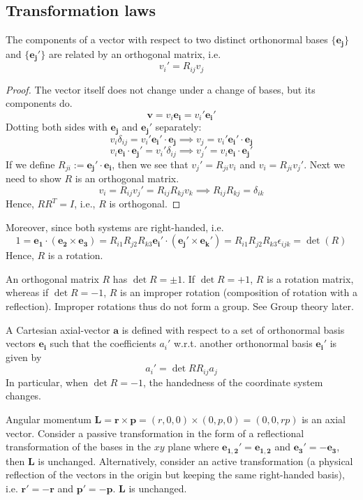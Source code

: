 \documentclass[a4paper]{article}
\begin{document}
\subsection{Transformation laws}
\begin{prop}[Vectors]
The components of a vector with respect to two distinct orthonormal bases $\{\mathbf{e_j}\}$ and $\{\mathbf{e_j'}\}$ are related by an orthogonal matrix, i.e.
$$v_i'=R_{ij}v_j$$
\end{prop}
\begin{proof}
The vector itself does not change under a change of bases, but its components do.
$$\mathbf{v}=v_i\mathbf{e_i}=v_i'\mathbf{e_i'}$$
Dotting both sides with $\mathbf{e_j}$ and $\mathbf{e_j'}$ separately:
$$v_i\delta_{ij}=v_i'\mathbf{e_i'}\cdot\mathbf{e_j}\implies v_j=v_i'\mathbf{e_i'}\cdot\mathbf{e_j}$$
$$v_i\mathbf{e_i}\cdot\mathbf{e_j'}=v_i'\delta_{ij}\implies v_j'=v_i\mathbf{e_i}\cdot\mathbf{e_j'}$$
If we define $R_{ji}:=\mathbf{e_j'}\cdot\mathbf{e_i}$, then we see that $v_j'=R_{ji}v_i$ and $v_i=R_{ji}v_j'$. Next we need to show $R$ is an orthogonal matrix.
$$v_i=R_{ij}v_j'=R_{ij}R_{kj}v_k\implies R_{ij}R_{kj}=\delta_{ik}$$
Hence, $RR^T=I$, i.e., $R$ is orthogonal.
\end{proof}
Moreover, since both systems are right-handed, i.e. $$1=\mathbf{e_1}\cdot(\mathbf{e_2}\times\mathbf{e_3})=R_{i1}R_{j2}R_{k3}\mathbf{e_i'}\cdot(\mathbf{e_j'}\times\mathbf{e_k'})=R_{i1}R_{j2}R_{k3}\epsilon_{ijk}=\det(R)$$
Hence, $R$ is a rotation.
\begin{remarks}
An orthogonal matrix $R$ has $\det R=\pm1$. If $\det R=+1$, $R$ is a rotation matrix, whereas if $\det R=-1$, $R$ is an improper rotation (composition of rotation with a reflection). Improper rotations thus do not form a group. See Group theory later.
\end{remarks}
\begin{defi}
A Cartesian axial-vector $\mathbf{a}$ is defined with respect to a set of orthonormal basis vectors $\mathbf{e_i}$ such that the coefficients $a_i'$ w.r.t. another orthonormal basis $\mathbf{e_i'}$ is given by
$$a_i'=\det R R_{ij}a_j$$
In particular, when $\det R=-1$, the handedness of the coordinate system changes.
\end{defi}
\begin{eg}
Angular momentum $\mathbf{L}=\mathbf{r}\times\mathbf{p}=(r,0,0)\times(0,p,0)=(0,0,rp)$ is an axial vector. Consider a passive transformation in the form of a reflectional transformation of the bases in the $xy$ plane where $\mathbf{e_{1,2}'}=\mathbf{e_{1,2}}$ and $\mathbf{e_3'}=-\mathbf{e_3}$, then $\mathbf{L}$ is unchanged. Alternatively, consider an active transformation (a physical reflection of the vectors in the origin but keeping the same right-handed basis), i.e. $\mathbf{r'}=-\mathbf{r}$ and $\mathbf{p'}=-\mathbf{p}$. $\mathbf{L}$ is unchanged. 
\end{eg}
\end{document}
